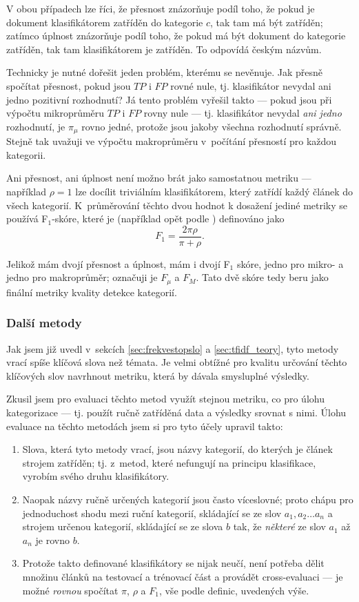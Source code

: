 \documentclass[12pt,a4paper]{report}
\begin{document}
V obou případech lze říci, že přesnost znázorňuje podíl toho, že pokud je dokument klasifikátorem zatříděn do kategorie $c$, tak tam má být zatříděn; zatímco úplnost znázorňuje podíl toho, že pokud má být dokument do kategorie zatříděn, tak tam klasifikátorem je zatříděn. To odpovídá českým názvům. 

Technicky je nutné dořešit jeden problém, kterému se \cite{machine_intro} ne\-vě\-nu\-je. Jak přesně spočítat přesnost, pokud jsou $TP$ i $FP$ rovné nule, tj. klasifikátor nevydal ani jedno pozitivní rozhodnutí? Já tento problém vyřešil takto --- pokud jsou při výpočtu mikroprůměru $TP$ i $FP$ rovny nule --- tj. klasifikátor nevydal \emph{ani jedno} rozhodnutí, je $\pi_{\mu}$ rovno jedné, protože jsou jakoby všechna rozhodnutí správně. Stejně tak uvažuji ve výpočtu makroprůměru v~počítání  přesností pro každou kategorii.

Ani přesnost, ani úplnost není možno brát jako samostatnou metriku --- například $\rho=1$ lze docílit triviálním klasifikátorem, který zatřídí každý článek do všech kategorií. K~průměrování těchto dvou hodnot k dosažení jediné metriky se používá F$_1$-skóre, které je (například opět podle \cite{machine_intro}) definováno jako $$F_1=\frac{2\pi\rho}{\pi+\rho}.$$ 

Jelikož mám dvojí přesnost a úplnost, mám i dvojí F$_1$ skóre, jedno pro mikro- a jedno pro makroprůměr; označuji je $F_\mu$ a $F_M$. Tato dvě skóre tedy beru jako finální metriky kvality detekce kategorií.

\subsubsection{Další metody}
\label{sec:dalsimetody}

Jak jsem již uvedl v~sekcích \ref{sec:frekvestopslo} a \ref{sec:tfidf_teory}, tyto metody vrací spíše klíčová slova než témata. Je velmi obtížné pro kvalitu určování těchto klíčových slov navrhnout metriku, která by dávala smysluplné výsledky.

Zkusil jsem pro evaluaci těchto metod využít stejnou metriku, co pro úlohu kategorizace --- tj. použít ručně zatříděná data a výsledky srovnat s nimi. Úlohu evaluace na těchto metodách jsem si pro tyto účely upravil takto:
\begin{enumerate}
    \item Slova, která tyto metody vrací, jsou názvy kategorií, do kterých je článek strojem zatříděn; tj. z~metod, které nefungují na principu klasifikace, vyrobím svého druhu klasifikátory.
    \item Naopak názvy ručně určených kategorií jsou často víceslovné; proto chápu pro jednoduchost shodu mezi ruční kategorií, skládající se ze slov $a_1, a_2 \ldots a_n$ a strojem určenou kategorií, skládající se ze slova $b$ tak, že \emph{některé} ze slov $a_1$ až $a_n$ je rovno $b$.
    \item Protože takto definované klasifikátory se nijak neučí, není potřeba dělit množinu článků na testovací a trénovací část a provádět cross-evaluaci --- je možné \emph{rovnou} spočítat $\pi$, $\rho$ a $F_1$, vše podle definic, uvedených výše.
\end{enumerate}
\end{document}
